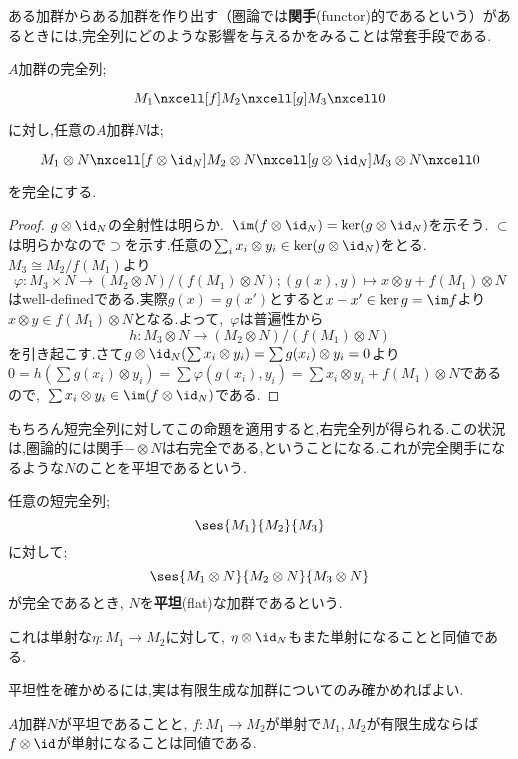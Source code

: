ある加群からある加群を作り出す（圏論では\textbf{関手}(functor)的であるという）があるときには,完全列にどのような影響を与えるかをみることは常套手段である.

\begin{prop}[テンソル積の右完全性]
	$A$加群の完全列;
	\[\begin{tikzcd}
	M_1\nxcell[f]M_2\nxcell[g]M_3\nxcell0
	\end{tikzcd}\]
	に対し,任意の$A$加群$N$は;
	\[\begin{tikzcd}
	M_1\otimes N\nxcell[f\otimes\id_{N}]M_2\otimes N\nxcell[g\otimes\id_{N}]M_3\otimes N\nxcell0
	\end{tikzcd}\]
	を完全にする.
\end{prop}
\begin{proof}
	$g\otimes\id_{N}$の全射性は明らか.~$\im(f\otimes\id_{N})=\ker(g\otimes\id_{N})$を示そう. $\subset$は明らかなので$\supset$を示す.任意の$\sum_i x_i\otimes y_i\in\ker(g\otimes\id_{N})$をとる.~$M_3\cong M_2/f(M_1)$より
	\[\varphi:M_3\times N\to (M_2\otimes N)/(f(M_1)\otimes N);(g(x),y)\mapsto x\otimes y+f(M_1)\otimes N\]
	はwell-definedである.実際$g(x)=g(x')$とすると$x-x'\in\ker g=\im f$より$x\otimes y\in f(M_1)\otimes N$となる.よって,~$\varphi$は普遍性から
	\[h:M_3\otimes N\to(M_2\otimes N)/(f(M_1)\otimes N)\]
	を引き起こす.さて$g\otimes\id_{N}(\sum x_i\otimes y_i)=\sum g(x_i)\otimes y_i=0$より$0=h(\sum g(x_i)\otimes y_i)=\sum \varphi(g(x_i),y_i)=\sum x_i\otimes y_i+f(M_1)\otimes N$であるので,~$\sum x_i\otimes y_i\in\im(f\otimes\id_{N})$である.
\end{proof}
もちろん短完全列に対してこの命題を適用すると,右完全列が得られる.この状況は,圏論的には関手$-\otimes N$は右完全である,ということになる.これが完全関手になるような$N$のことを平坦であるという.

\begin{defi}[平坦加群]
	任意の短完全列;
	\[\ses{M_1}{M_2}{M_3}\]
	に対して;
	\[\ses{M_1\otimes N}{M_2\otimes N}{M_3\otimes N}\]
	が完全であるとき, $N$を\textbf{平坦}(flat)な加群であるという.
\end{defi}

これは単射な$\eta:M_1\to M_2$に対して, $\eta\otimes\id_{N}$もまた単射になることと同値である.

平坦性を確かめるには,実は有限生成な加群についてのみ確かめればよい.

\begin{prop}\label{prop:平坦性は有限生成を調べれば良い}
	$A$加群$N$が平坦であることと, $f:M_1\to M_2$が単射で$M_1,M_2$が有限生成ならば$f\otimes\id$が単射になることは同値である.
\end{prop}

